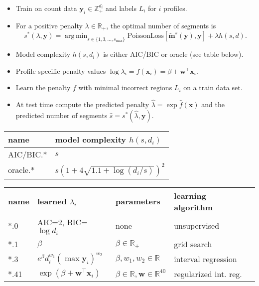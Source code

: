 \documentclass[legalpaper]{article}
\newcommand{\ZZ}{\mathbb Z}
\newcommand{\RR}{\mathbb R}
\DeclareMathOperator*{\argmin}{arg\,min}
\begin{document}
\begin{itemize}
\item Train on count data $\mathbf y_i\in\ZZ_+^{d_i}$ and labels $L_i$
  for $i$ profiles.
\item For a positive penalty $\lambda\in\RR_+$, the optimal number
  of segments is
\begin{equation*} s^*(\lambda, \mathbf y) =
    \argmin_{s\in\{1,3,\dots, s_{\text{max}}\}} \text{PoissonLoss}\left[
      \mathbf{\tilde m}^s(\mathbf y), \mathbf y \right] + \lambda h(s, d).
\end{equation*}
\item Model complexity $h(s, d_i)$ is either AIC/BIC or oracle (see
  table below).
\item Profile-specific penalty values $\log \lambda_i = 
  f(\mathbf x_i)
  = \beta + \mathbf w^\intercal \mathbf x_i
$.
\item Learn the penalty $f$ with minimal incorrect regions $L_i$ on a
  train data set.
\item At test time compute the predicted penalty $\hat \lambda = \exp
  \hat f(\mathbf x)$ and the predicted number of segments $\hat s =
  s^*(\hat \lambda, \mathbf y)$.
\end{itemize}

\newpage


  \begin{minipage}{0.5\textwidth}
\hskip -5cm
  \begin{tabular}{ll}
    \textbf{name} & \textbf{model complexity} $h(s, d_i)$ \\
    \hline
    AIC/BIC.* & $s$\\
    oracle.* & $s\left(1 + 4\sqrt{1.1 + \log(d_i/s)}\right)^2$
  \end{tabular}
  \end{minipage}
  \begin{minipage}{0.5\textwidth}
\hskip -4cm
  \begin{tabular}{lllll}
    \textbf{name} & \textbf{learned} $\lambda_i$ & 
    \textbf{parameters} & \textbf{learning algorithm} \\
    \hline
    *.0 & AIC=2, BIC=$\log d_i$ & none & unsupervised \\
    *.1 & 
    $\beta$ & 
    $\beta\in\RR_+$ & grid search \\
    *.3 & 
    $e^\beta d_i^{w_1} (\max \mathbf y_i)^{w_{2}}$ & 
    $\beta, w_1, w_{2}\in\RR$ & interval regression \\
    *.41 & 
    $\exp(\beta + \mathbf w^\intercal \mathbf x_i)$ & 
    $\beta\in\RR, \mathbf w\in\RR^{40}$ & 
    regularized int. reg. \\
  \end{tabular}
  \end{minipage}
\end{document}
